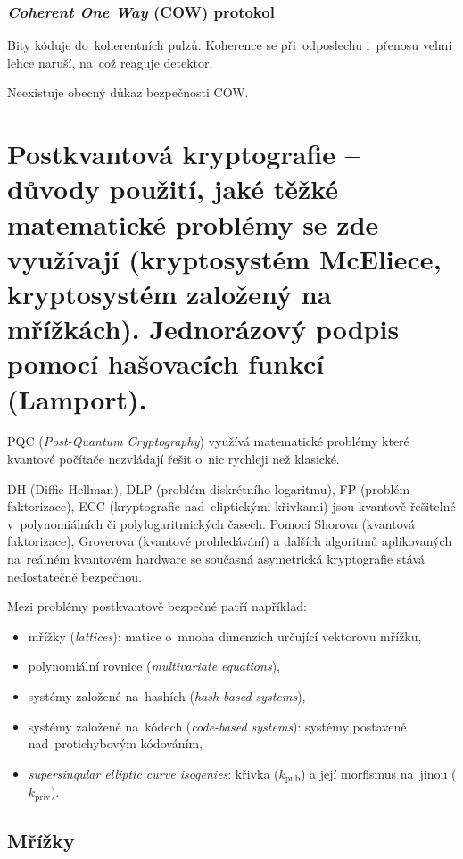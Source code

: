 \subsubsection*{\emph{Coherent One Way} (COW) protokol}

Bity kóduje do~koherentních pulzů.
Koherence se při~odposlechu i~přenosu velmi lehce naruší, na~což reaguje detektor.

Neexistuje obecný důkaz bezpečnosti COW.


\clearpage
\section{Postkvantová kryptografie -- důvody použití, jaké těžké matematické problémy se zde využívají (kryptosystém McEliece, kryptosystém založený na mřížkách). Jednorázový podpis pomocí hašovacích funkcí (Lamport).}

PQC (\emph{Post-Quantum Cryptography}) využívá matematické problémy které kvantové počítače nezvládají řešit o~nic rychleji než klasické.

DH (Diffie-Hellman), DLP (problém diskrétního logaritmu), FP (problém faktorizace), ECC (kryptografie nad~eliptickými křivkami) jsou kvantově řešitelné v~polynomiálních či polylogaritmických časech.
Pomocí Shorova (kvantová faktorizace), Groverova (kvantové prohledávání) a dalších algoritmů aplikovaných na~reálném kvantovém hardware se současná asymetrická kryptografie stává nedostatečně bezpečnou.

Mezi problémy postkvantově bezpečné patří například:

\begin{itemize}
\item mřížky (\emph{lattices}): matice o~mnoha dimenzích určující vektorovu mřížku,
\item polynomiální rovnice (\emph{multivariate equations}),
\item systémy založené na~hashích (\emph{hash-based systems}),
\item systémy založené na~kódech (\emph{code-based systems}): systémy postavené nad~protichybovým kódováním,
\item \emph{supersingular elliptic curve isogenies}: křivka ($k_\text{pub}$) a její morfismus na~jinou ($k_\text{priv}$).
\end{itemize}


\subsection{Mřížky}

